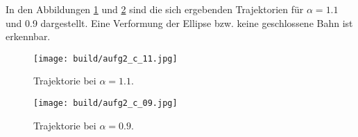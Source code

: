 In den Abbildungen \ref{fig:2_alpha11} und \ref{fig:2_alpha09} sind die sich ergebenden
Trajektorien für $\alpha = \num{1.1}$ und \num{0.9} dargestellt.
Eine Verformung der Ellipse bzw. keine geschlossene Bahn ist erkennbar.
\begin{figure}
    \centering
    \texttt{[image: build/aufg2\_c\_11.jpg]}
    \caption{Trajektorie bei $\alpha = \num{1.1}$.}
    \label{fig:2_alpha11}
\end{figure}
\begin{figure}
    \centering
    \texttt{[image: build/aufg2\_c\_09.jpg]}
    \caption{Trajektorie bei $\alpha = \num{0.9}$.}
    \label{fig:2_alpha09}
\end{figure}
